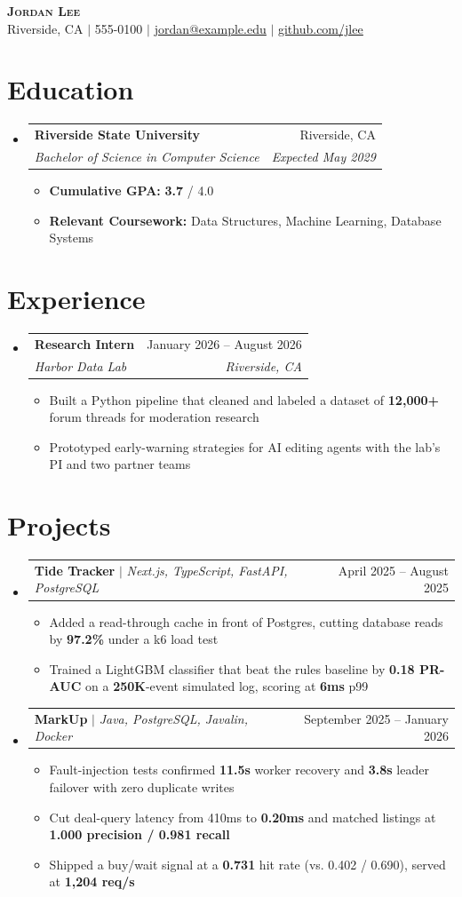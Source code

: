 \documentclass[letterpaper,11pt]{article}
\makeatletter
\newcommand{\resumeItem}[1]{
  \item\small{
    {#1 \vspace{-2pt}}
  }
}
\newcommand{\resumeSubheading}[4]{
  \vspace{-2pt}\item
    \begin{tabular*}{0.97\textwidth}[t]{l@{\extracolsep{\fill}}r}
      \textbf{#1} & #2 \\
      \textit{\small#3} & \textit{\small #4} \\
    \end{tabular*}\vspace{-7pt}
}
\newcommand{\resumeProjectHeading}[2]{
    \item
    \begin{tabular*}{0.97\textwidth}{l@{\extracolsep{\fill}}r}
      \small#1 & #2 \\
    \end{tabular*}\vspace{-7pt}
}
\newcommand{\resumeSubHeadingListStart}{\begin{itemize}[leftmargin=0.15in, label={}]}
\newcommand{\resumeSubHeadingListEnd}{\end{itemize}}
\newcommand{\resumeItemListStart}{\begin{itemize}}
\newcommand{\resumeItemListEnd}{\end{itemize}\vspace{-5pt}}
\makeatother
\begin{document}
\begin{center}
    \textbf{\Huge \scshape Jordan Lee} \\ \vspace{3pt}
    \small Riverside, CA $|$ 555-0100 $|$
    \href{mailto:jordan@example.edu}{\underline{jordan@example.edu}} $|$
    \href{https://github.com/jlee}{\underline{github.com/jlee}}
\end{center}

\section{Education}
  \resumeSubHeadingListStart
    \resumeSubheading
      {Riverside State University}{Riverside, CA}
      {Bachelor of Science in Computer Science}{Expected May 2029}
    \resumeItemListStart
      \resumeItem{\textbf{Cumulative GPA:} \textbf{3.7} / 4.0}
      \resumeItem{\textbf{Relevant Coursework:} Data Structures, Machine Learning, Database Systems}
    \resumeItemListEnd
  \resumeSubHeadingListEnd

\section{Experience}
  \resumeSubHeadingListStart
    \resumeSubheading
      {Research Intern}{January 2026 -- August 2026}
      {Harbor Data Lab}{Riverside, CA}
      \resumeItemListStart
        \resumeItem{Built a Python pipeline that cleaned and labeled a dataset of \textbf{12,000+} forum threads for moderation research}
        \resumeItem{Prototyped early-warning strategies for AI editing agents with the lab's PI and two partner teams}
      \resumeItemListEnd
  \resumeSubHeadingListEnd

\section{Projects}
    \resumeSubHeadingListStart
      \resumeProjectHeading
        {\textbf{Tide Tracker} $|$ \emph{Next.js, TypeScript, FastAPI, PostgreSQL}}{April 2025 -- August 2025}
        \resumeItemListStart
          \resumeItem{Added a read-through cache in front of Postgres, cutting database reads by \textbf{97.2\%} under a k6 load test}
          \resumeItem{Trained a LightGBM classifier that beat the rules baseline by \textbf{0.18 PR-AUC} on a \textbf{250K}-event simulated log, scoring at \textbf{6ms} p99}
        \resumeItemListEnd
      \resumeProjectHeading
        {\textbf{MarkUp} $|$ \emph{Java, PostgreSQL, Javalin, Docker}}{September 2025 -- January 2026}
        \resumeItemListStart
          \resumeItem{Fault-injection tests confirmed \textbf{11.5s} worker recovery and \textbf{3.8s} leader failover with zero duplicate writes}
          \resumeItem{Cut deal-query latency from 410ms to \textbf{0.20ms} and matched listings at \textbf{1.000 precision / 0.981 recall}}
          \resumeItem{Shipped a buy/wait signal at a \textbf{0.731} hit rate (vs. 0.402 / 0.690), served at \textbf{1,204 req/s}}
        \resumeItemListEnd
    \resumeSubHeadingListEnd
\end{document}
